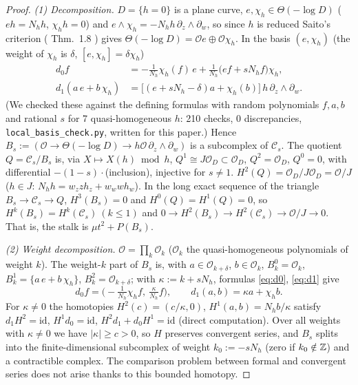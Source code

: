\begin{proof}
\emph{(1) Decomposition.} $D=\{h=0\}$ is a plane curve, $e,\chi_h\in\Theta(-\log D)$ ($eh=N_hh$, $\chi_hh=0$) and $e\wedge\chi_h=-N_hh\,\partial_z\wedge\partial_w$, so since $h$ is reduced Saito's criterion (\cite{Saito} Thm.~1.8 \tC \tQ) gives $\Theta(-\log D)=\mathcal Oe\oplus\mathcal O\chi_h$. In the basis $(e,\chi_h)$ (the weight of $\chi_h$ is $\delta$, $[e,\chi_h]=\delta\chi_h$)
\begin{align}
d_0f&=-\tfrac1{N_h}\chi_h(f)\,e+\tfrac1{N_h}\bigl(ef+sN_hf\bigr)\chi_h,\label{eq:d0}\\
d_1(a\,e+b\,\chi_h)&=\bigl[(e+sN_h-\delta)a+\chi_h(b)\bigr]\,h\,\partial_z\wedge\partial_w.\label{eq:d1}
\end{align}
(\tV We checked these against the defining formulas with random polynomials $f,a,b$ and rational $s$ for 7 quasi-homogeneous $h$: 210 checks, 0 discrepancies, \texttt{local\_basis\_check.py}, written for this paper.) Hence $B_s:=(\mathcal O\to\Theta(-\log D)\to h\mathcal O\,\partial_z\wedge\partial_w)$ is a subcomplex of $\mathcal C_s$. The quotient $Q=\mathcal C_s/B_s$ is, via $X\mapsto X(h)\bmod h$, $Q^1\cong J\mathcal O_D\subset\mathcal O_D$, $Q^2=\mathcal O_D$, $Q^0=0$, with differential $-(1-s)\cdot$(inclusion), injective for $s\ne1$. $H^2(Q)=\mathcal O_D/J\mathcal O_D=\mathcal O/J$ ($h\in J$: $N_hh=w_zzh_z+w_wwh_w$). In the long exact sequence of the triangle $B_s\to\mathcal C_s\to Q$, $H^3(B_s)=0$ and $H^0(Q)=H^1(Q)=0$, so $H^k(B_s)=H^k(\mathcal C_s)\ (k\le1)$ and $0\to H^2(B_s)\to H^2(\mathcal C_s)\to\mathcal O/J\to0$. That is, the stalk is $\mu t^2+P(B_s)$.

\emph{(2) Weight decomposition.} $\mathcal O=\prod_k\mathcal O_k$ ($\mathcal O_k$ the quasi-homogeneous polynomials of weight $k$). The weight-$k$ part of $B_s$ is, with $a\in\mathcal O_{k+\delta}$, $b\in\mathcal O_k$, $B^0_k=\mathcal O_k$, $B^1_k=\{a\,e+b\,\chi_h\}$, $B^2_k=\mathcal O_{k+\delta}$; with $\kappa:=k+sN_h$, formulas \eqref{eq:d0}, \eqref{eq:d1} give
\[d_0f=\bigl(-\tfrac1{N_h}\chi_hf,\ \tfrac\kappa{N_h}f\bigr),\qquad d_1(a,b)=\kappa a+\chi_hb.\]
For $\kappa\ne0$ the homotopies $H^2(c)=(c/\kappa,0)$, $H^1(a,b)=N_hb/\kappa$ satisfy $d_1H^2=\mathrm{id}$, $H^1d_0=\mathrm{id}$, $H^2d_1+d_0H^1=\mathrm{id}$ (direct computation). Over all weights with $\kappa\ne0$ we have $|\kappa|\ge c>0$, so $H$ preserves convergent series, and $B_s$ splits into the finite-dimensional subcomplex of weight $k_0:=-sN_h$ (zero if $k_0\notin\mathbb Z$) and a contractible complex. The comparison problem between formal and convergent series does not arise thanks to this bounded homotopy.


\end{proof}
